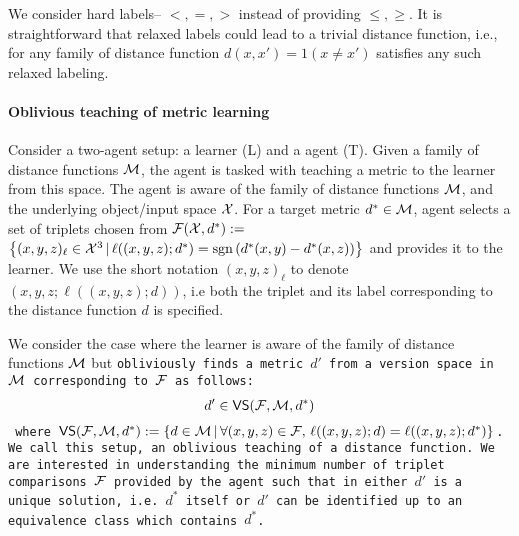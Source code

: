 We consider hard labels-- $<,=,>$ instead of providing $\le,\ge$. It is straightforward that relaxed labels could lead to a trivial distance function, i.e., for any family of distance function $d(x,x') = 1(x \neq x')$ satisfies any such relaxed labeling.

\paragraph{Oblivious teaching of metric learning} Consider a two-agent setup: a learner (L)  and a agent (T). Given a family of distance functions ${\mathcal{M}}$, the agent is tasked with teaching a metric to the learner from this space. The agent is aware of the family of distance functions ${\mathcal{M}}$, and the underlying object/input space ${\mathcal{X}}$. For a target metric $d^* \in {\mathcal{M}}$, 
agent selects a set of triplets chosen from ${\mathcal{F}}({\mathcal{X}},d^*) :=$ $\left\{(x,y,z)_{\ell} \in {\mathcal{X}}^3 \,|\, \ell((x,y,z);d^*) = \operatorname{sgn} \left( {d^*(x,y) - d^*(x,z)} \right) \right\}$ and provides it to the learner. We use the short notation $(x,y,z)_{\ell}$ to denote $(x,y,z; \ell((x,y,z);d))$, i.e both the triplet and its label corresponding to the distance function $d$ is specified.

We consider the case where the learner is aware of the family of distance functions ${\mathcal{M}}$ but \tt{obliviously} finds a metric $d'$ from a version space in ${\mathcal{M}}$ corresponding to ${\mathcal{F}}$ as follows:
\begin{align}
    d' \in {\sf{VS}}(\cF, \cM, d^*) \label{eq: sol}%
\end{align}
where ${\textsf{VS}}({\mathcal{F}}, {\mathcal{M}}, d^*) := \left\{d \in {\mathcal{M}}\,|\, \forall (x,y,z) \in {\mathcal{F}},\, \ell((x,y,z);d) = \ell((x,y,z);d^*)\right\}$.
We call this setup, an \tt{oblivious teaching of a distance function}. We are interested in understanding the minimum number of triplet comparisons ${\mathcal{F}}$ provided by the agent such that in  either $d'$ is a unique solution, i.e. $d^*$ itself or $d'$ can be identified up to an equivalence class which contains $d^*$. 

